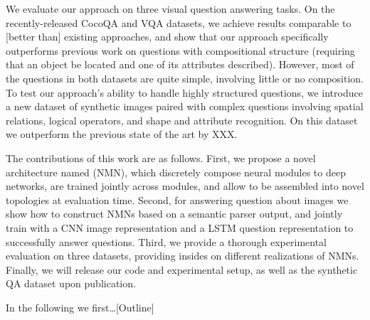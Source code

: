 




We evaluate our approach on three visual question answering tasks. On the
recently-released CocoQA \cite{yu15arxiv} and  VQA \cite{antol15iccv} datasets, we achieve results comparable to
[better than] existing approaches, and show that our approach specifically outperforms
previous work on questions with compositional structure (\eg requiring that an
object be located and one of its attributes described). However, most of the
questions in both datasets are quite simple, involving little or no composition.
To test our approach's ability to handle highly structured questions, we
introduce a new dataset of synthetic images paired with complex questions
involving spatial relations, logical operators, and shape and attribute
recognition. On this dataset we outperform the previous state of the art by XXX.


The contributions of this work are as follows. First, we propose a novel architecture named \nmn (NMN), which discretely compose neural
modules to deep networks, are trained jointly across modules, and allow to be assembled into novel topologies at evaluation time.
Second, for answering question about images we show how to construct NMNs based on a semantic parser output, and jointly train with a CNN image representation and a LSTM question representation to successfully answer questions. 
Third, we provide a thorough experimental evaluation on three datasets, providing insides on different realizations of NMNs.
Finally, we will release our code and experimental setup, as well as the synthetic QA dataset upon publication.

In the following we first\ldots  [Outline]